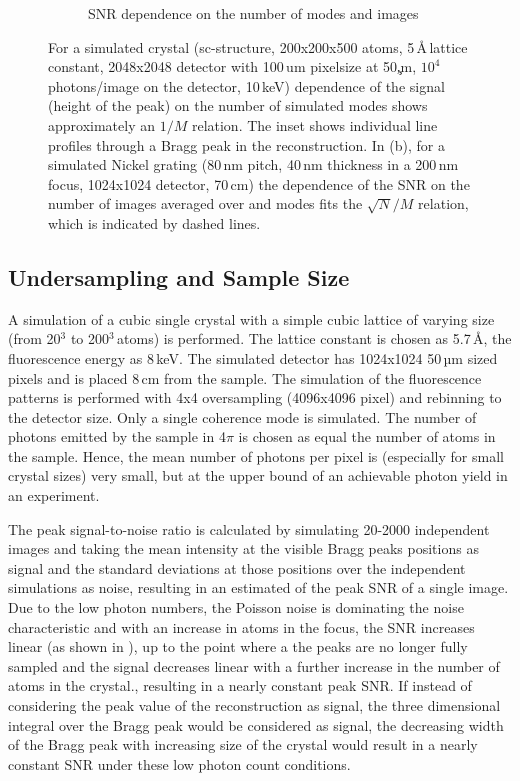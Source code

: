 \begin{figure}
\begin{subfigure}[b]{0.45\textwidth}
	\caption{SNR dependence on the number of modes and images}
	\label{fig:Nimages}
\end{subfigure}
\caption[SNR dependence on the number of modes and images]{For a simulated crystal
	(sc-structure, 200x200x500 atoms, 5\,\AA\,lattice constant, 2048x2048 detector with 100\,um pixelsize at 50\c,m, $10^4$ photons/image on the detector, 10\,keV) dependence of the signal (height of the peak) on the number of simulated modes shows approximately an $1/M$ relation.  The inset shows individual line profiles through a Bragg peak in the reconstruction. In (b), for a simulated Nickel grating (80\,nm pitch, 40\,nm thickness in a 200\,nm focus, 1024x1024 detector, 70\,cm) the dependence of the SNR on the number of images averaged over and modes fits the $\sqrt{N}/M$ relation, which is indicated by dashed lines.}
\end{figure}

\subsection{Undersampling and  Sample Size}


A simulation of a cubic single crystal with a simple cubic lattice of varying size (from 20$^3$ to 200$^3$\,atoms) is performed. The lattice constant is chosen as 5.7\,\AA, the fluorescence energy as 8\,keV. The simulated detector has 1024x1024 50\,µm sized pixels and is placed 8\,cm from the  sample. 
The simulation of the fluorescence patterns is performed with 4x4 oversampling (4096x4096 pixel) and rebinning to the detector size. Only a single coherence mode is simulated. The number of photons emitted by the sample in 4$\pi$ is chosen as equal the number of atoms in the sample. Hence, the mean number of photons per pixel is (especially for small crystal sizes) very small, but at the upper bound of an achievable photon yield in an experiment.

The peak signal-to-noise ratio is calculated by simulating 20-2000 independent images  and taking the mean intensity at the visible Bragg peaks positions as signal and the standard deviations at those positions over the independent simulations as noise, resulting in an estimated of the peak SNR of a single image.
Due to the low photon numbers, the Poisson noise is dominating the noise characteristic and with an increase in atoms in the focus, the SNR increases linear (as shown in ), up to the point where a the peaks are no longer fully sampled and the signal decreases linear with a further increase in the number of atoms in the crystal., resulting in a nearly constant peak SNR.
If instead of considering the peak value of the reconstruction as signal, the three dimensional integral over the Bragg peak would be considered as signal, the decreasing width of the Bragg peak with increasing size of the crystal would result in a nearly constant SNR under these low photon count conditions. 

